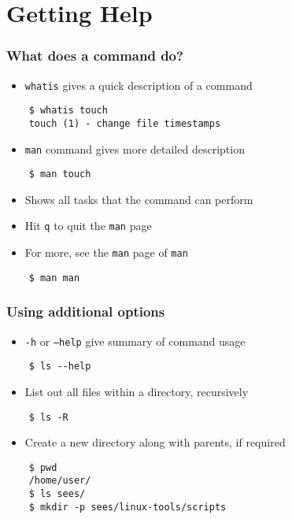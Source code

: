 \documentclass[12pt,compress]{beamer}
\newcounter{time}
\begin{document}
\section{Getting Help}
\begin{frame}[fragile]
  \frametitle{What does a command do?}

  \begin{itemize}
  \item \texttt{whatis} gives a quick description of a command
  \end{itemize}
  \begin{lstlisting}
    $ whatis touch
    touch (1) - change file timestamps
  \end{lstlisting} %
  \begin{itemize}
  \item \texttt{man} command gives more detailed description
  \end{itemize}
  \begin{lstlisting}
    $ man touch
  \end{lstlisting} %
  \begin{itemize}
  \item Shows all tasks that the command can perform
  \item Hit \texttt{q} to quit the \texttt{man} page
  \item For more, see the \texttt{man} page of \texttt{man}
  \end{itemize}
  \begin{lstlisting}
    $ man man
  \end{lstlisting} %
\end{frame}

\begin{frame}[fragile]
  \frametitle{Using additional options}

  \begin{itemize}
  \item \texttt{-h} or \texttt{--help} give summary of command usage
  \end{itemize}
  \begin{lstlisting}
    $ ls --help
  \end{lstlisting} %
  \begin{itemize}
  \item List out all files within a directory, recursively
  \end{itemize}
  \begin{lstlisting}
    $ ls -R
  \end{lstlisting} %
  \begin{itemize}
  \item Create a new directory along with parents, if required
  \end{itemize}
  \begin{lstlisting}
    $ pwd
    /home/user/
    $ ls sees/
    $ mkdir -p sees/linux-tools/scripts
  \end{lstlisting} %
\end{frame}
\end{document}

